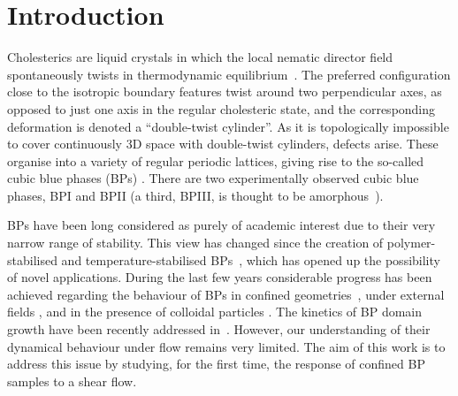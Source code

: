 \documentclass[12pt,twoside]{iopart}
\begin{document}
\section{Introduction}
Cholesterics are liquid crystals in which the local nematic director field spontaneously twists in thermodynamic equilibrium~\cite{deGennes}.
The preferred configuration close to the isotropic boundary features twist around two perpendicular axes, as opposed to just one axis in the regular cholesteric state, and the corresponding deformation is denoted a ``double-twist cylinder''.
As it is topologically impossible to cover continuously 3D space with double-twist cylinders, defects arise. These organise into a variety of regular periodic lattices, giving rise to the so-called cubic blue phases (BPs) \cite{Grebel:1984,Wright:1989}. There are two experimentally observed cubic blue phases, BPI and BPII (a third, BPIII, is thought to be amorphous~\cite{Henrich:2011a}).

BPs have been long considered as purely of academic interest due to their very narrow range of stability. This view has changed since the creation of
polymer-stabilised and temperature-stabilised BPs~\cite{Kikuchi:2002,Coles:2005}, which has opened up the possibility of novel applications.
During the last few years considerable progress has been achieved regarding the behaviour of BPs in confined geometries~\cite{Fukuda:2010a, Fukuda:2010b, Ravnik:2011b}, under external fields \cite{Alexander:2008,Fukuda:2009,Henrich:2010a,Castles:2010,Tiribocchi:2011}, and in the presence of colloidal particles \cite{Ravnik:2011a}. 
The kinetics of BP domain growth have been recently addressed in~\cite{Henrich:2010b}. However, our understanding of their dynamical behaviour under flow remains
very limited. The aim of this work is to address this issue by studying,
for the first time, the response of confined BP samples to a shear flow.
\end{document}
